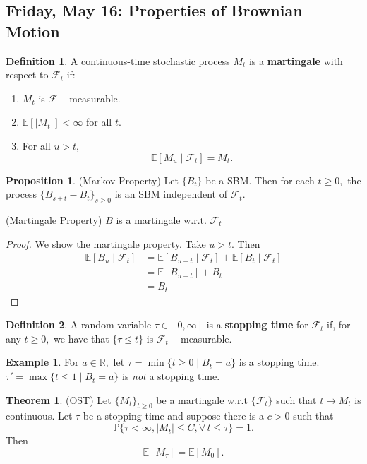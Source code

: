 \documentclass[10pt, oneside]{article}
\newcommand{\bbR}{\mathbb{R}}
\newcommand{\bbP}{\mathbb{P}}
\newcommand{\bbE}{\mathbb{E}}
\theoremstyle{definition}
\newtheorem{exmp}{Example}[section]
\newtheorem{thm}{Theorem}
\newtheorem{defn}{Definition}
\newtheorem{prop}{Proposition}
\begin{document}
\newpage
\subsection{Friday, May 16: Properties of Brownian Motion}
\begin{defn}
    A continuous-time stochastic process $M_t$ is a \textbf{martingale} with respect to $\mathcal{F}_t$ if:
    \begin{enumerate}
        \item $M_t$ is $\mathcal{F}-$measurable.
        \item $\bbE[|M_t|] < \infty$ for all $t.$
        \item For all $u >t,$ 
        \[\bbE[M_u \mid \mathcal{F}_t] = M_t.\]
    \end{enumerate}
\end{defn}
\begin{prop}
    (Markov Property) Let $\{B_t\}$ be a SBM. Then for each $t\geq 0,$ the process $\{B_{s + t} - B_t\}_{s\geq 0}$ is an SBM independent of $\mathcal{F}_t.$ 

    (Martingale Property) $B$ is a martingale w.r.t. $\mathcal{F}_t$
\end{prop}
\begin{proof}
    We show the martingale property. Take $u>t.$ Then 
    \begin{align*}
        \bbE[B_u \mid \mathcal{F}_t] &= \bbE[B_{u-t} \mid \mathcal{F}_t] + \bbE[B_t \mid \mathcal{F}_t]\\
        &= \bbE[B_{u-t}] + B_t\\
        &= B_t
    \end{align*}
\end{proof}

\begin{defn}
    A random variable $\tau \in [0, \infty]$ is a \textbf{stopping time} for $\mathcal{F}_t$ if, for any $t\geq 0,$ we have that $\{\tau \leq t\}$ is $\mathcal{F}_t-$measurable. 
\end{defn}
\begin{exmp}
    For $a\in \bbR,$ let $\tau = \min\{t \geq 0 \mid B_t = a\}$ is a stopping time. $\tau' = \max\{t\leq 1 \mid B_t= a\}$ is \textit{not} a stopping time.
\end{exmp}

\begin{thm}
    (OST) Let $\{M_t\}_{t\geq 0}$ be a martingale w.r.t $\{\mathcal{F}_t\}$ such that $t\mapsto M_t$ is continuous. Let $\tau$ be a stopping time and suppose there is a $c>0$ such that 
    \[\bbP\{\tau < \infty, |M_t| \leq C, \forall\,t\leq \tau\} = 1.\] Then 
    \[\bbE[M_\tau] = \bbE[M_0].\]
\end{thm}
\end{document}
